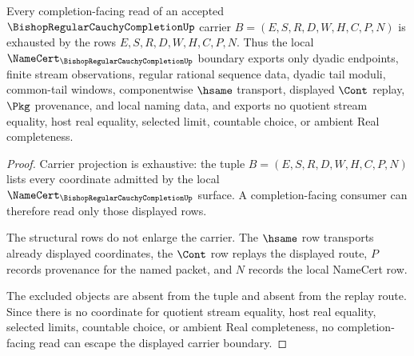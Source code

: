 \begin{theorem}
\label{thm:bishop-regular-cauchy-completion-nonescape-exactness}
Every completion-facing read of an accepted $\BishopRegularCauchyCompletionUp$ carrier $B=(E,S,R,D,W,H,C,P,N)$ is exhausted by the rows $E,S,R,D,W,H,C,P,N$. Thus the local $\NameCert_{\BishopRegularCauchyCompletionUp}$ boundary exports only dyadic endpoints, finite stream observations, regular rational sequence data, dyadic tail moduli, common-tail windows, componentwise $\hsame$ transport, displayed $\Cont$ replay, $\Pkg$ provenance, and local naming data, and exports no quotient stream equality, host real equality, selected limit, countable choice, or ambient Real completeness.
\end{theorem}
\begin{proof}
Carrier projection is exhaustive: the tuple $B=(E,S,R,D,W,H,C,P,N)$ lists every coordinate admitted by the local $\NameCert_{\BishopRegularCauchyCompletionUp}$ surface. A completion-facing consumer can therefore read only those displayed rows.

The structural rows do not enlarge the carrier. The $\hsame$ row transports already displayed coordinates, the $\Cont$ row replays the displayed route, $P$ records provenance for the named packet, and $N$ records the local NameCert row.

The excluded objects are absent from the tuple and absent from the replay route. Since there is no coordinate for quotient stream equality, host real equality, selected limits, countable choice, or ambient Real completeness, no completion-facing read can escape the displayed carrier boundary.
\end{proof}


